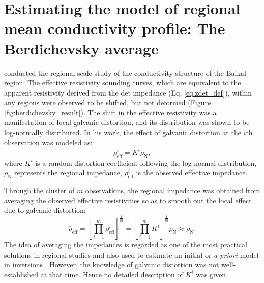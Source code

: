 
		
\section[Berdichevsky average]{Estimating the model of regional mean conductivity profile: The Berdichevsky average} \label{sect:berdichevsky}
		\citet{berdichevsky1980a} conducted the regional-scale study of the conductivity structure of the Baikal region. The effective resistivity sounding curves, which are equivalent to the apparent resistivity derived from the det impedance (Eq. \ref{eq:zdet_def}), within any regions were observed to be shifted, but not deformed (Figure \ref{fig:berdichevsky_result}).
		The shift in the effective resistivity was a manifestation of local galvanic distortion, and its distribution was shown to be log-normally distributed.
		In his work, the effect of galvanic distortion at the $i$th observation was modeled as:
		\begin{equation}\label{eq:berdichevsky_galvanicdistortion_model}
			\rho_\text{eff}^i=K^i\rho_\text{N},
		\end{equation}
		where $K^i$ is a random distortion coefficient following the log-normal distribution, $\rho_\text{N}$ represents the regional impedance, $\rho_\text{eff}^i$ is the observed effective impedance. 

		Through the cluster of $m$ observations, the regional impedance was obtained from averaging the observed effective resistivities so as to smooth out the local effect due to galvanic distortion: 
		\begin{equation} \label{eq:berdichevsky_avg_def}
			\bar{\rho}_\text{eff} = \left[ \prod\limits_{i=1}^m \rho^i_\text{eff} \right]^\frac{1}{m} = \left[ \prod\limits_{i=1}^m K^i \right]^\frac{1}{m} \rho_\text{N} \approx \rho_\text{N}.
		\end{equation}	
		The idea of averaging the impedances is regarded as one of the most practical solutions in regional studies \citep[e.g.,][]{baba2010a} and also used to estimate an initial or \emph{a priori} model in inversions \citep[e.g.,][]{tournerie2002a, tada2014a, avdeeva2015a}.
		 However, the knowledge of galvanic distortion was not well-established at that time. Hence no detailed description of $K^i$ was given.

